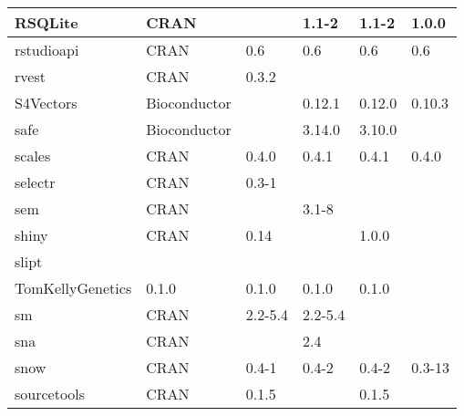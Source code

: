 \begin{longtable}{|llllll|}
RSQLite                       & CRAN                      &             & 1.1-2       & 1.1-2          & 1.0.0             \\ \hline \rowcolor{gray!25}
rstudioapi                    & CRAN                      & 0.6         & 0.6         & 0.6            & 0.6              \\ \hline
rvest                         & CRAN                      & 0.3.2       &             &                &                   \\ \hline \rowcolor{gray!25}
S4Vectors                     & Bioconductor              &             & 0.12.1      & 0.12.0         & 0.10.3           \\ \hline
safe                          & Bioconductor              &             & 3.14.0      & 3.10.0         &                   \\ \hline \rowcolor{gray!25}
scales                        & CRAN                      & 0.4.0       & 0.4.1       & 0.4.1          & 0.4.0            \\ \hline
selectr                       & CRAN                      & 0.3-1       &             &                &                   \\ \hline \rowcolor{gray!25}
sem                           & CRAN                      &             & 3.1-8       &                &                  \\ \hline
shiny                         & CRAN                      & 0.14        &             & 1.0.0          &                   \\ \hline \rowcolor{gray!25}
slipt                         & \begin{tabular}[c]{@{}l@{}}GitHub \\ TomKellyGenetics \end{tabular}  & 0.1.0       & 0.1.0       & 0.1.0          & 0.1.0            \\ \hline
sm                            & CRAN                      & 2.2-5.4     & 2.2-5.4     &                &                   \\ \hline \rowcolor{gray!25}
sna                           & CRAN                      &             & 2.4         &                &                  \\ \hline
snow                          & CRAN                      & 0.4-1       & 0.4-2       & 0.4-2          & 0.3-13            \\ \hline \rowcolor{gray!25}
sourcetools                   & CRAN                      & 0.1.5       &             & 0.1.5          &                  \\ \hline

\end{longtable}
